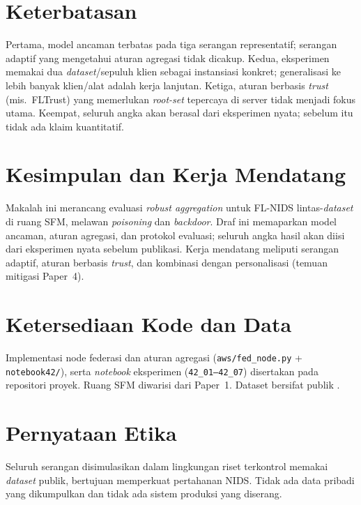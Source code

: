 \documentclass[11pt,a4paper]{article}
\begin{document}
\FloatBarrier
\section{Keterbatasan}
\label{sec:limitations}

Pertama, model ancaman terbatas pada tiga serangan representatif; serangan adaptif
yang mengetahui aturan agregasi tidak dicakup. Kedua, eksperimen memakai dua
\emph{dataset}/sepuluh klien sebagai instansiasi konkret; generalisasi ke lebih
banyak klien/alat adalah kerja lanjutan. Ketiga, aturan berbasis \emph{trust}
(mis.\ FLTrust) yang memerlukan \emph{root-set} tepercaya di server tidak menjadi
fokus utama. Keempat, seluruh angka akan berasal dari eksperimen nyata; sebelum itu
tidak ada klaim kuantitatif.

\FloatBarrier
\section{Kesimpulan dan Kerja Mendatang}
\label{sec:conclusion}

Makalah ini merancang evaluasi \emph{robust aggregation} untuk FL-NIDS
lintas-\emph{dataset} di ruang SFM, melawan \emph{poisoning} dan \emph{backdoor}.
Draf ini memaparkan model ancaman, aturan agregasi, dan protokol evaluasi; seluruh
angka hasil akan diisi dari eksperimen nyata sebelum publikasi. Kerja mendatang
meliputi serangan adaptif, aturan berbasis \emph{trust}, dan kombinasi dengan
personalisasi (temuan mitigasi Paper~4).

\section*{Ketersediaan Kode dan Data}
Implementasi node federasi dan aturan agregasi (\texttt{aws/fed\_node.py} +
\texttt{notebook42/}), serta \emph{notebook} eksperimen (\texttt{42\_01--42\_07})
disertakan pada repositori proyek. Ruang SFM diwarisi dari Paper~1. Dataset bersifat
publik \cite{cicids,unsw}.

\section*{Pernyataan Etika}
Seluruh serangan disimulasikan dalam lingkungan riset terkontrol memakai
\emph{dataset} publik, bertujuan memperkuat pertahanan NIDS. Tidak ada data pribadi
yang dikumpulkan dan tidak ada sistem produksi yang diserang.
\end{document}

